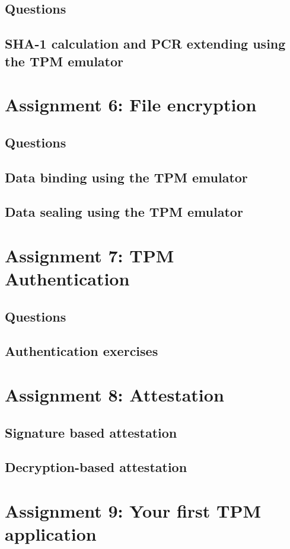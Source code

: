 \documentclass[10pt]{article}
\begin{document}
\subsection{Questions}
\subsection{SHA-1 calculation and PCR extending using the TPM emulator}
\section{Assignment 6: File encryption}
\subsection{Questions}
\subsection{Data binding using the TPM emulator}
\subsection{Data sealing using the TPM emulator}
\section{Assignment 7: TPM Authentication}
\subsection{Questions}
\subsection{Authentication exercises}
\section{Assignment 8: Attestation}
\subsection{Signature based attestation}
\subsection{Decryption-based attestation}
\section{Assignment 9: Your first TPM application}
\end{document}
